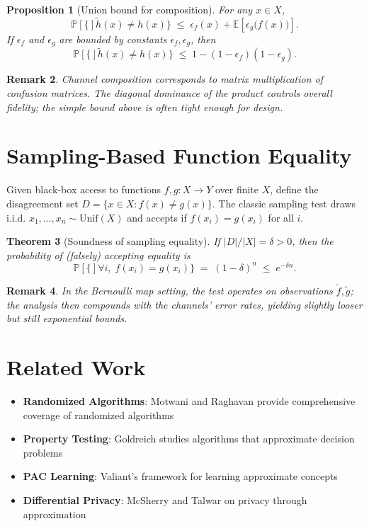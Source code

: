 \documentclass[11pt,final,hidelinks]{article}
\newtheorem{theorem}{Theorem}[section]
\newtheorem{proposition}[theorem]{Proposition}
\newtheorem{remark}[theorem]{Remark}
\newcommand{\obs}[1]{\widetilde{#1}}  %
\newcommand{\Prob}[1]{\mathbb{P}\left[#1\right]}
\newcommand{\Expect}[1]{\mathbb{E}\left[#1\right]}
\newcommand{\error}{\epsilon}
\begin{document}
\begin{proposition}[Union bound for composition]
For any $x\in X$,
\begin{equation}
\Prob\{\obs{h}(x)\neq h(x)\} \;\le\; \error_f(x) + \Expect{\error_g\bigl(f(x)\bigr)}.
\end{equation}
If $\error_f$ and $\error_g$ are bounded by constants $\epsilon_f,\epsilon_g$, then
\begin{equation}
\Prob\{\obs{h}(x)\neq h(x)\} \;\le\; 1-(1-\epsilon_f)(1-\epsilon_g).
\end{equation}
\end{proposition}

\begin{remark}
Channel composition corresponds to matrix multiplication of confusion matrices. The diagonal dominance of the product controls overall fidelity; the simple bound above is often tight enough for design.
\end{remark}

\section{Sampling-Based Function Equality}

Given black-box access to functions $f,g:X\to Y$ over finite $X$, define the disagreement set $D=\{x\in X: f(x)\neq g(x)\}$. The classic sampling test draws i.i.d. $x_1,\dots,x_n\sim\mathrm{Unif}(X)$ and accepts if $f(x_i)=g(x_i)$ for all $i$.

\begin{theorem}[Soundness of sampling equality]
If $|D|/|X|=\delta>0$, then the probability of (falsely) accepting equality is
\begin{equation}
\Prob\{ \forall i,\; f(x_i)=g(x_i) \} \;=\; (1-\delta)^n \;\le\; e^{-\delta n}.
\end{equation}
\end{theorem}

\begin{remark}
In the Bernoulli map setting, the test operates on observations $\obs{f},\obs{g}$; the analysis then compounds with the channels' error rates, yielding slightly looser but still exponential bounds.
\end{remark}

\section{Related Work}

\begin{itemize}
    \item \textbf{Randomized Algorithms}: Motwani and Raghavan \cite{motwani1995} provide comprehensive coverage of randomized algorithms
    \item \textbf{Property Testing}: Goldreich \cite{goldreich2017} studies algorithms that approximate decision problems
    \item \textbf{PAC Learning}: Valiant's framework \cite{valiant1984} for learning approximate concepts
    \item \textbf{Differential Privacy}: McSherry and Talwar \cite{mcsherry2007} on privacy through approximation
\end{itemize}
\end{document}
